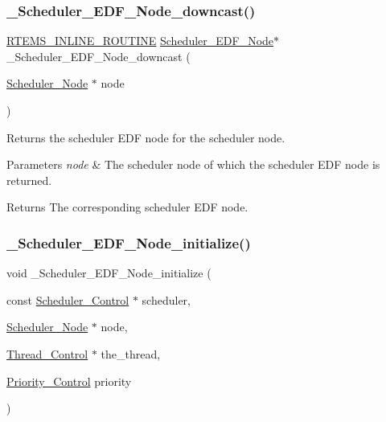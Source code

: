 \subsubsection{\texorpdfstring{\_Scheduler\_EDF\_Node\_downcast()}{\_Scheduler\_EDF\_Node\_downcast()}}
{\footnotesize\ttfamily \mbox{\hyperlink{group__RTEMSScoreBaseDefs_gac216239df231d5dbd15e3520b0b9313f}{R\+T\+E\+M\+S\+\_\+\+I\+N\+L\+I\+N\+E\+\_\+\+R\+O\+U\+T\+I\+NE}} \mbox{\hyperlink{structScheduler__EDF__Node}{Scheduler\+\_\+\+E\+D\+F\+\_\+\+Node}}$\ast$ \+\_\+\+Scheduler\+\_\+\+E\+D\+F\+\_\+\+Node\+\_\+downcast (\begin{DoxyParamCaption}\item[{\mbox{\hyperlink{structScheduler__Node}{Scheduler\+\_\+\+Node}} $\ast$}]{node }\end{DoxyParamCaption})}



Returns the scheduler E\+DF node for the scheduler node. 


\begin{DoxyParams}{Parameters}
{\em node} & The scheduler node of which the scheduler E\+DF node is returned.\\
\hline
\end{DoxyParams}
\begin{DoxyReturn}{Returns}
The corresponding scheduler E\+DF node. 
\end{DoxyReturn}
\mbox{\label{group__RTEMSScoreSchedulerEDF_ga465fd54ce1c8c0633424db0933856c67}} 
\subsubsection{\texorpdfstring{\_Scheduler\_EDF\_Node\_initialize()}{\_Scheduler\_EDF\_Node\_initialize()}}
{\footnotesize\ttfamily void \+\_\+\+Scheduler\+\_\+\+E\+D\+F\+\_\+\+Node\+\_\+initialize (\begin{DoxyParamCaption}\item[{const \mbox{\hyperlink{struct__Scheduler__Control}{Scheduler\+\_\+\+Control}} $\ast$}]{scheduler,  }\item[{\mbox{\hyperlink{structScheduler__Node}{Scheduler\+\_\+\+Node}} $\ast$}]{node,  }\item[{\mbox{\hyperlink{struct__Thread__Control}{Thread\+\_\+\+Control}} $\ast$}]{the\+\_\+thread,  }\item[{\mbox{\hyperlink{group__RTEMSScorePriority_ga59d02b58072d31a9a1cfe644557aefe2}{Priority\+\_\+\+Control}}}]{priority }\end{DoxyParamCaption})}



